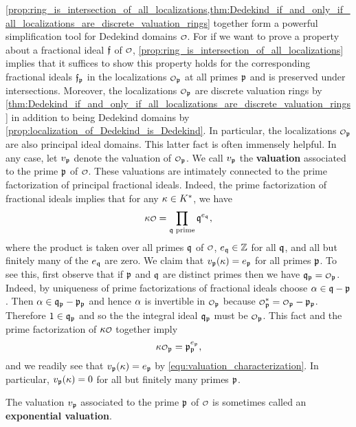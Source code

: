     \cref{prop:ring_is_intersection_of_all_localizations,thm:Dedekind_if_and_only_if_all_localizations_are_discrete_valuation_rings} together form a powerful simplification tool for Dedekind domains $\smc{O}$. For if we want to prove a property about a fractional ideal $\mathfrak{f}$ of $\smc{O}$, \cref{prop:ring_is_intersection_of_all_localizations} implies that it suffices to show this property holds for the corresponding fractional ideals $\mathfrak{f}_{\mathfrak{p}}$ in the localizations $\smc{O}_{\mf{p}}$ at all primes $\mathfrak{p}$ and is preserved under intersections. Moreover, the localizations $\smc{O}_{\mf{p}}$ are discrete valuation rings by \cref{thm:Dedekind_if_and_only_if_all_localizations_are_discrete_valuation_rings} in addition to being Dedekind domains by \cref{prop:localization_of_Dedekind_is_Dedekind}. In particular, the localizations $\smc{O}_{\mf{p}}$ are also principal ideal domains. This latter fact is often immensely helpful. In any case, let $v_{\mathfrak{p}}$ denote the valuation of $\smc{O}_{\mf{p}}$. We call $v_{\mathfrak{p}}$ the \textbf{valuation} associated to the prime $\mathfrak{p}$ of $\smc{O}$. These valuations are intimately connected to the prime factorization of principal fractional ideals. Indeed, the prime factorization of fractional ideals implies that for any $\kappa \in K^{\ast}$, we have
    \[
      \k\smc{O} = \prod_{\text{$\mf{q}$ prime}}\mf{q}^{e_{\mf{q}}},
    \]
    where the product is taken over all primes $\mathfrak{q}$ of $\smc{O}$, $e_{\mathfrak{q}} \in \mathbb{Z}$ for all $\mathfrak{q}$, and all but finitely many of the $e_{\mathfrak{q}}$ are zero. We claim that $v_{\mathfrak{p}}(\kappa) = e_{\mathfrak{p}}$ for all primes $\mathfrak{p}$. To see this, first observe that if $\mathfrak{p}$ and $\mathfrak{q}$ are distinct primes then we have $\mf{q}_{\mf{p}} = \smc{O}_{\mf{p}}$. Indeed, by uniqueness of prime factorizations of fractional ideals choose $\alpha \in \mathfrak{q}-\mathfrak{p}$. Then $\alpha \in \mathfrak{q}_{\mathfrak{p}}-\mathfrak{p}_{\mathfrak{p}}$ and hence $\alpha$ is invertible in $\smc{O}_{\mf{p}}$ because $\smc{O}_{\mf{p}}^{\ast} = \smc{O}_{\mf{p}}-\mf{p}_{\mf{p}}$. Therefore $1 \in \mathfrak{q}_{\mathfrak{p}}$ and so the the integral ideal $\mathfrak{q}_{\mathfrak{p}}$ must be $\smc{O}_{\mf{p}}$. This fact and the prime factorization of $\k\smc{O}$ together imply
    \[
      \k\smc{O}_{\mf{p}} = \mf{p}_{\mf{p}}^{e_{\mf{p}}},
    \]
    and we readily see that $v_{\mathfrak{p}}(\kappa) = e_{\mathfrak{p}}$ by \cref{equ:valuation_characterization}. In particular, $v_{\mathfrak{p}}(\kappa) = 0$ for all but finitely many primes $\mathfrak{p}$.

    \begin{remark}
      The valuation $v_{\mathfrak{p}}$ associated to the prime $\mathfrak{p}$ of $\smc{O}$ is sometimes called an \textbf{exponential valuation}.
    \end{remark}

